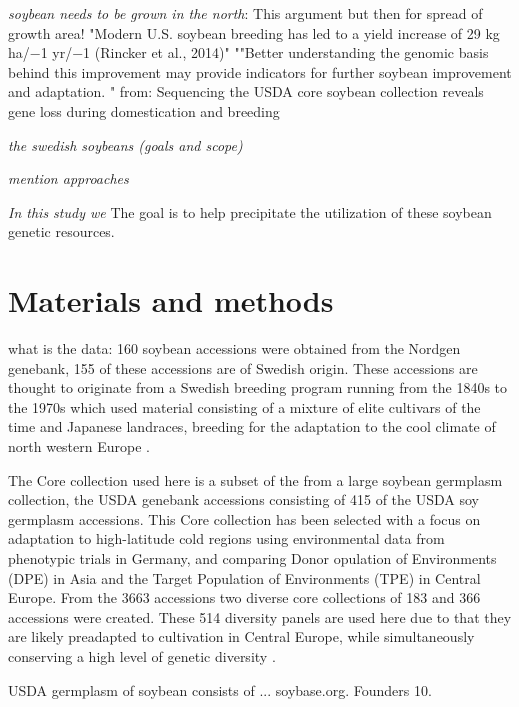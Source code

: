 \documentclass[9pt, onecolumn,twoside]{gsajnl}
\begin{document}
\textit{soybean needs to be grown in the north}:  This argument but then for spread of growth area! "Modern U.S. soybean breeding has led to a yield increase of 29 kg ha/−1 yr/−1 (Rincker et al., 2014)" 
 ""Better understanding the genomic basis behind this improvement may provide indicators for further soybean improvement and adaptation. "  from: Sequencing the USDA core soybean collection reveals gene loss during domestication and breeding

\textit{the swedish soybeans (goals and scope)}

\textit{mention approaches}

\textit{In this study we}
The goal is to help precipitate the utilization of these soybean genetic resources. 

\section{Materials and methods}
\label{sec:materials:methods}

what is the data: 160 soybean accessions were obtained from the Nordgen genebank, 155 of these accessions are of Swedish origin. These accessions are thought to originate from a Swedish breeding program running from the 1840s to the 1970s which used material consisting of a mixture of elite cultivars of the time and Japanese landraces, breeding for the adaptation to the cool climate of north western Europe \cite{holmberg1973}. 
 
The Core collection used here is a subset of the from a large soybean germplasm collection, the  USDA genebank accessions consisting of 415 of the USDA soy germplasm accessions. This Core collection has been selected with a focus on adaptation to high-latitude cold regions using environmental data from phenotypic trials in Germany, and comparing Donor opulation of Environments (DPE) in Asia and the Target Population of Environments (TPE) in Central Europe. From the 3663 accessions two diverse core collections of 183 and 366 accessions were created. These 514 diversity panels are used here due to that they are likely preadapted to cultivation in Central Europe, while simultaneously conserving a high level of genetic diversity .  

USDA germplasm of soybean consists of ... soybase.org.  Founders 10. 
\end{document}

